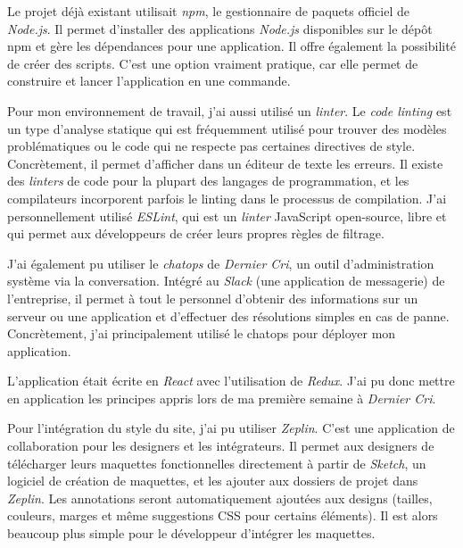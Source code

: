 \documentclass[12pt,a4paper]{article}
\begin{document}
  \bigskip

  Le projet déjà existant utilisait \emph{npm}, le gestionnaire de paquets
  officiel de \emph{Node.js}. Il permet d'installer des applications
  \emph{Node.js} disponibles sur le dépôt npm et gère les dépendances pour
  une application. Il offre également la possibilité de créer des scripts.
  C'est une option vraiment pratique, car elle permet de construire et
  lancer l'application en une commande.

  \bigskip

  Pour mon environnement de travail, j'ai aussi utilisé un \emph{linter}.
  Le \emph{code linting} est un type d'analyse statique qui est
  fréquemment utilisé pour trouver des modèles problématiques ou le code
  qui ne respecte pas certaines directives de style. Concrètement, il
  permet d'afficher dans un éditeur de texte les erreurs. Il existe des
  \emph{linters} de code pour la plupart des langages de programmation, et
  les compilateurs incorporent parfois le linting dans le processus de
  compilation. J'ai personnellement utilisé \emph{ESLint}, qui est un
  \emph{linter} JavaScript open-source, libre et qui permet aux
  développeurs de créer leurs propres règles de filtrage.

  \bigskip

  J'ai également pu utiliser le \emph{chatops} de \emph{Dernier Cri}, un
  outil d'administration système via la conversation. Intégré au
  \emph{Slack} (une application de messagerie) de l'entreprise, il permet
  à tout le personnel d'obtenir des informations sur un serveur ou une
  application et d'effectuer des résolutions simples en cas de panne.
  Concrètement, j'ai principalement utilisé le chatops pour déployer mon
  application.

  \bigskip

  L'application était écrite en \emph{React} avec l'utilisation de
  \emph{Redux}. J'ai pu donc mettre en application les principes appris
  lors de ma première semaine à \emph{Dernier Cri}.

  \bigskip

  Pour l'intégration du style du site, j'ai pu utiliser \emph{Zeplin}.
  C'est une application de collaboration pour les designers et les
  intégrateurs. Il permet aux designers de télécharger leurs maquettes
  fonctionnelles directement à partir de \emph{Sketch}, un logiciel de
  création de maquettes, et les ajouter aux dossiers de projet dans
  \emph{Zeplin}. Les annotations seront automatiquement ajoutées aux
  designs (tailles, couleurs, marges et même suggestions CSS pour certains
  éléments). Il est alors beaucoup plus simple pour le développeur
  d'intégrer les maquettes.
\end{document}

